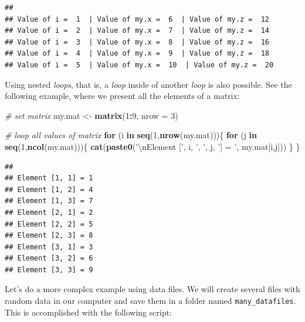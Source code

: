 \documentclass[11pt,]{book}
\newenvironment{Shaded}{\begin{snugshade}}{\end{snugshade}}
\newcommand{\KeywordTok}[1]{\textcolor[rgb]{0.27,0.27,0.27}{\textbf{#1}}}
\newcommand{\DataTypeTok}[1]{\textcolor[rgb]{0.27,0.27,0.27}{#1}}
\newcommand{\DecValTok}[1]{\textcolor[rgb]{0.06,0.06,0.06}{#1}}
\newcommand{\CharTok}[1]{\textcolor[rgb]{0.5,0.5,0.5}{#1}}
\newcommand{\StringTok}[1]{\textcolor[rgb]{0.5,0.5,0.5}{#1}}
\newcommand{\CommentTok}[1]{\textcolor[rgb]{0.56,0.35,0.01}{\textit{#1}}}
\newcommand{\ControlFlowTok}[1]{\textcolor[rgb]{0.13,0.29,0.53}{\textbf{#1}}}
\newcommand{\OperatorTok}[1]{\textcolor[rgb]{0.81,0.36,0.00}{\textbf{#1}}}
\newcommand{\NormalTok}[1]{#1}
\begin{document}
\begin{verbatim}
## 
## Value of i =  1  | Value of my.x =  6  | Value of my.z =  12
## Value of i =  2  | Value of my.x =  7  | Value of my.z =  14
## Value of i =  3  | Value of my.x =  8  | Value of my.z =  16
## Value of i =  4  | Value of my.x =  9  | Value of my.z =  18
## Value of i =  5  | Value of my.x =  10  | Value of my.z =  20
\end{verbatim}

Using nested \emph{loops}, that is, a \emph{loop} inside of another
\emph{loop} is also possible. See the following example, where we
present all the elements of a matrix:

\begin{Shaded}
\begin{Highlighting}[]
\CommentTok{# set matrix}
\NormalTok{my.mat <-}\StringTok{ }\KeywordTok{matrix}\NormalTok{(}\DecValTok{1}\OperatorTok{:}\DecValTok{9}\NormalTok{, }\DataTypeTok{nrow =} \DecValTok{3}\NormalTok{)}

\CommentTok{# loop all values of matrix}
\ControlFlowTok{for}\NormalTok{ (i }\ControlFlowTok{in} \KeywordTok{seq}\NormalTok{(}\DecValTok{1}\NormalTok{,}\KeywordTok{nrow}\NormalTok{(my.mat)))\{}
  \ControlFlowTok{for}\NormalTok{ (j }\ControlFlowTok{in} \KeywordTok{seq}\NormalTok{(}\DecValTok{1}\NormalTok{,}\KeywordTok{ncol}\NormalTok{(my.mat)))\{}
    \KeywordTok{cat}\NormalTok{(}\KeywordTok{paste0}\NormalTok{(}\StringTok{'}\CharTok{\textbackslash{}n}\StringTok{Element ['}\NormalTok{, i, }\StringTok{', '}\NormalTok{, j, }\StringTok{'] = '}\NormalTok{, my.mat[i,j]))}
\NormalTok{  \}}
\NormalTok{\}}
\end{Highlighting}
\end{Shaded}

\begin{verbatim}
## 
## Element [1, 1] = 1
## Element [1, 2] = 4
## Element [1, 3] = 7
## Element [2, 1] = 2
## Element [2, 2] = 5
## Element [2, 3] = 8
## Element [3, 1] = 3
## Element [3, 2] = 6
## Element [3, 3] = 9
\end{verbatim}

Let's do a more complex example using data files. We will create several
files with random data in our computer and save them in a folder named
\texttt{many\_datafiles}. This is accomplished with the following
script:
\end{document}
